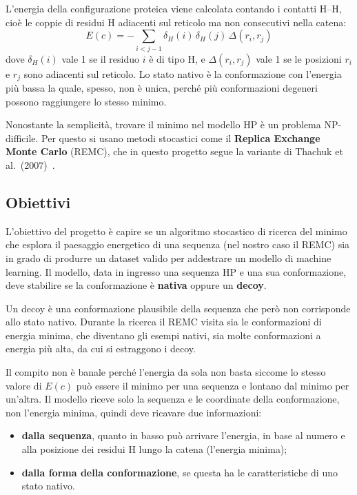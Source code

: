 \documentclass[11pt,a4paper]{article}
\begin{document}
L'energia della configurazione proteica viene calcolata contando i contatti H--H, cioè le coppie di residui H adiacenti sul reticolo ma non consecutivi nella catena:
\begin{equation}
  E(c) = -\sum_{i < j - 1} \delta_{H}(i)\, \delta_{H}(j)\, \Delta(r_i, r_j)
  \label{eq:energia}
\end{equation}
dove $\delta_H(i)$ vale 1 se il residuo $i$ è di tipo H, e $\Delta(r_i, r_j)$ vale 1 se le posizioni $r_i$ e $r_j$ sono adiacenti sul reticolo. Lo stato nativo è la conformazione con l'energia più bassa la quale, spesso, non è unica, perché più conformazioni degeneri possono raggiungere lo stesso minimo.

Nonostante la semplicità, trovare il minimo nel modello HP è un problema NP-difficile. Per questo si usano metodi stocastici come il \textbf{Replica Exchange Monte Carlo} (REMC), che in questo progetto segue la variante di Thachuk et al.\ (2007)~\cite{thachuk2007}.

\subsection{Obiettivi}
\label{sec:obiettivi}

L'obiettivo del progetto è capire se un algoritmo stocastico di ricerca del minimo che esplora il paesaggio energetico di una sequenza (nel nostro caso il REMC) sia in grado di produrre un dataset valido per addestrare un modello di machine learning. Il modello, data in ingresso una sequenza HP e una sua conformazione, deve stabilire se la conformazione è \textbf{nativa} oppure un \textbf{decoy}.

Un decoy è una conformazione plausibile della sequenza che però non corrisponde allo stato nativo. Durante la ricerca il REMC visita sia le conformazioni di energia minima, che diventano gli esempi nativi, sia molte conformazioni a energia più alta, da cui si estraggono i decoy.

Il compito non è banale perché l'energia da sola non basta siccome lo stesso valore di $E(c)$ può essere il minimo per una sequenza e lontano dal minimo per un'altra. Il modello riceve solo la sequenza e le coordinate della conformazione, non l'energia minima, quindi deve ricavare due informazioni:
\begin{itemize}
  \item \textbf{dalla sequenza}, quanto in basso può arrivare l'energia, in base al numero e alla posizione dei residui H lungo la catena (l'energia minima);
  \item \textbf{dalla forma della conformazione}, se questa ha le caratteristiche di uno stato nativo.
\end{itemize}
\end{document}

